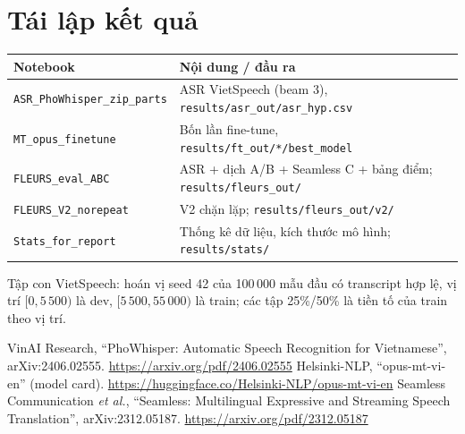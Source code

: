 \documentclass[12pt,a4paper]{article}
\begin{document}
\section{Tái lập kết quả}
\begin{table}[H]\centering\small
\begin{tabularx}{\textwidth}{>{\raggedright\arraybackslash}p{4.6cm}Y}\toprule
Notebook & Nội dung / đầu ra\\\midrule
\texttt{ASR\_PhoWhisper\_zip\_parts} & ASR VietSpeech (beam 3), \texttt{results/asr\_out/asr\_hyp.csv}\\
\texttt{MT\_opus\_finetune} & Bốn lần fine-tune, \texttt{results/ft\_out/*/best\_model}\\
\texttt{FLEURS\_eval\_ABC} & ASR + dịch A/B + Seamless C + bảng điểm; \texttt{results/fleurs\_out/}\\
\texttt{FLEURS\_V2\_norepeat} & V2 chặn lặp; \texttt{results/fleurs\_out/v2/}\\
\texttt{Stats\_for\_report} & Thống kê dữ liệu, kích thước mô hình; \texttt{results/stats/}\\\bottomrule
\end{tabularx}
\end{table}
Tập con VietSpeech: hoán vị seed 42 của 100\,000 mẫu đầu có transcript hợp lệ, vị trí $[0, 5\,500)$ là dev, $[5\,500, 55\,000)$ là train; các tập 25\%/50\% là tiền tố của train theo vị trí.

\begin{thebibliography}{9}
 VinAI Research, ``PhoWhisper: Automatic Speech Recognition for Vietnamese'', arXiv:2406.02555. \url{https://arxiv.org/pdf/2406.02555}
 Helsinki-NLP, ``opus-mt-vi-en'' (model card). \url{https://huggingface.co/Helsinki-NLP/opus-mt-vi-en}
 Seamless Communication \emph{et al.}, ``Seamless: Multilingual Expressive and Streaming Speech Translation'', arXiv:2312.05187. \url{https://arxiv.org/pdf/2312.05187}
\end{thebibliography}
\end{document}
